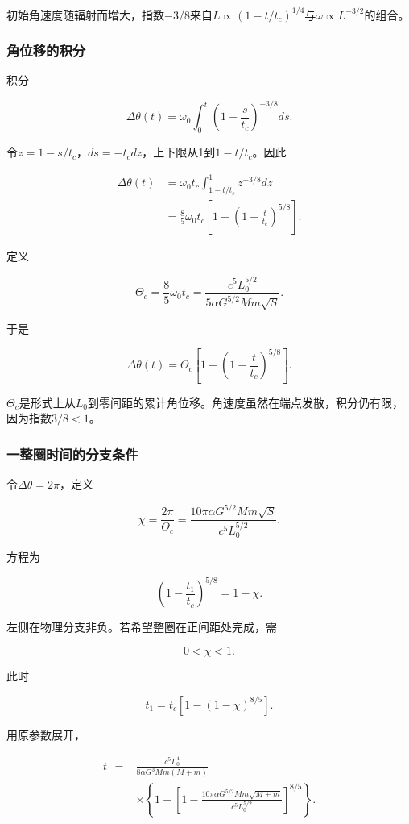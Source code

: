 \documentclass[12pt,a4paper,fontset=fandol]{ctexart}
\begin{document}
初始角速度随辐射而增大，指数\(-3/8\)来自\(L\propto(1-t/t_c)^{1/4}\)与\(\omega\propto L^{-3/2}\)的组合。

\subsubsection{角位移的积分}\label{ux89d2ux4f4dux79fbux7684ux79efux5206}

积分

\[
\Delta\theta(t)
=\omega_0\int_0^t
\left(1-\frac s{t_c}\right)^{-3/8}ds.
\]

令\(z=1-s/t_c\)，\(ds=-t_cdz\)，上下限从1到\(1-t/t_c\)。因此

\[
\begin{aligned}
\Delta\theta(t)
&=\omega_0t_c
\int_{1-t/t_c}^1z^{-3/8}dz\\
&=\frac85\omega_0t_c
\left[1-\left(1-\frac t{t_c}\right)^{5/8}\right].
\end{aligned}
\]

定义

\[
\boxed{
\Theta_c=\frac85\omega_0t_c
=\frac{c^5L_0^{5/2}}
{5\alpha G^{5/2}Mm\sqrt S}}.
\]

于是

\[
\boxed{
\Delta\theta(t)=\Theta_c
\left[1-\left(1-\frac t{t_c}\right)^{5/8}\right]}.
\]

\(\Theta_c\)是形式上从\(L_0\)到零间距的累计角位移。角速度虽然在端点发散，积分仍有限，因为指数\(3/8<1\)。

\subsubsection{一整圈时间的分支条件}\label{ux4e00ux6574ux5708ux65f6ux95f4ux7684ux5206ux652fux6761ux4ef6}

令\(\Delta\theta=2\pi\)，定义

\[
\chi=\frac{2\pi}{\Theta_c}
=\frac{10\pi\alpha G^{5/2}Mm\sqrt S}
{c^5L_0^{5/2}}.
\]

方程为

\[
\left(1-\frac{t_1}{t_c}\right)^{5/8}=1-\chi.
\]

左侧在物理分支非负。若希望整圈在正间距处完成，需

\[
\boxed{0<\chi<1}.
\]

此时

\[
\boxed{
t_1=t_c\left[1-(1-\chi)^{8/5}\right]}.
\]

用原参数展开，

\[
\boxed{
\begin{aligned}
t_1={}&\frac{c^5L_0^4}{8\alpha G^3Mm(M+m)}\\
&\times\left\{
1-\left[
1-\frac{10\pi\alpha G^{5/2}Mm\sqrt{M+m}}
{c^5L_0^{5/2}}
\right]^{8/5}
\right\}.
\end{aligned}}
\]
\end{document}
